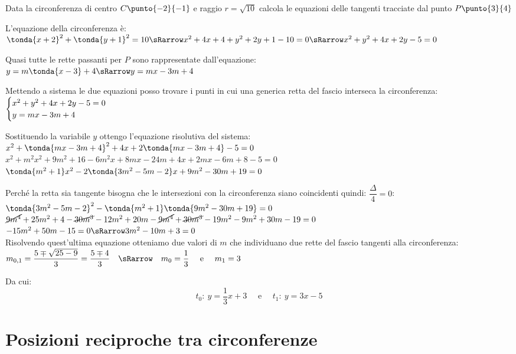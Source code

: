 \begin{esempio}
Data la circonferenza di centro \(C\punto{-2}{-1}\) e raggio \(r=\sqrt{10}\) 
calcola le equazioni delle tangenti tracciate dal punto \(P\punto{3}{4}\)

L'equazione della circonferenza è: \\
\(\tonda{x +2}^2 + \tonda{y+1}^2 = 10
\sRarrow x^2 +4x +4 +y^2 +2y +1 -10 = 0
\sRarrow x^2 +y^2 +4x +2y -5 = 0\)

Quasi tutte le rette passanti per \(P\) sono rappresentate dall'equazione: \\
\(y = m \tonda{x -3} +4 \sRarrow y = mx -3m +4\)

Mettendo a sistema le due equazioni posso trovare i punti in cui una generica 
retta del fascio interseca la circonferenza: \\
\(\begin{cases}x^2 +y^2 +4x +2y -5 = 0 \\ y = mx -3m +4\end{cases}\)

Sostituendo la variabile \(y\) ottengo l'equazione risolutiva del sistema: \\
\(x^2 +\tonda{mx -3m +4}^2 +4x +2\tonda{mx -3m +4} -5 = 0 \)\\
\(x^2 +m^2x^2 +9m^2 +16 -6m^2x +8mx -24m +4x +2mx -6m +8 -5 = 0 \)\\
\(\tonda{m^2 +1}x^2 - 2\tonda{3m^2 -5m -2}x +9m^2 -30m +19 = 0 \)

Perché la retta sia tangente bisogna che le intersezioni con la circonferenza 
siano coincidenti quindi: \(\dfrac{\Delta}{4} = 0\): \\
\(\tonda{3m^2 -5m -2}^2 - \tonda{m^2 +1} \tonda{9m^2 -30m +19} = 0 \) \\
\(\cancel{9m^4} +25m^2 +4 -\cancel{30m^3} -12m^2 + 20 m -
\cancel{9m^4} +\cancel{30m^3} -19m^2 -9m^2 +30m -19= 0 \) \\
\(-15m^2 +50 m -15= 0 \sRarrow 3m^2 -10m +3 = 0\) \\

Risolvendo quest'ultima equazione otteniamo due valori di \(m\) che individuano 
due rette del fascio tangenti alla circonferenza: \\
\(m_{0, 1} = \dfrac{5 \mp \sqrt{25-9}}{3} = \dfrac{5 \mp 4}{3} \quad \sRarrow
\quad m_0 = \dfrac{1}{3} \quad \text{ e } \quad m_1 = 3\)

Da cui: 
\[t_0:~y = \dfrac{1}{3}x +3 \quad \text{ e } \quad t_1:~y = 3x -5\]

\end{esempio}

\section{Posizioni reciproche tra circonferenze}
\label{sec:circ_posizionireciproche}

